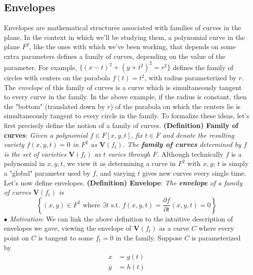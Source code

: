 \documentclass{article}
\begin{document}
\subsection{Envelopes}
Envelopes are mathematical structures associated with families of curves in the plane. In the context in which we'll be studying them, a polynomial curve in the plane $ F^2 $, like the ones with which we've been working, that depends on some extra parameters defines a family of curves, depending on the value of the parameter. For example, $ \{ (x - t)^2 + (y + t^2)^2 = r^2 \} $ defines the family of circles with centers on the parabola $ f(t) = t^2 $, with radius parameterized by $ r $. The \textit{envelope} of this family of curves is a curve which is simultaneously tangent to every curve in the family. In the above example, if the radius is constant, then the "bottom" (translated down by $ r $) of the parabola on which the centers lie is simultaneously tangent to every circle in the family. To formalize these ideas, let's first precisely define the notion of a family of curves.
\newline \newline
\textbf{(Definition) Family of curves}: \textit{Given a polynomial $ f \in F[x, y, t] $, fix $ t \in F $ and denote the resulting variety $f(x, y, t) = 0 $ in $ F^2 $ as $ \mathbf{V}(f_t) $. The \textbf{family of curves} determined by $ f $ is the set of varieties $ \mathbf{V}(f_t) $ as $ t $ varies through $ F $.}
\newline \newline
Although technically $ f $ is a polynomial in $ x, y, t $, we view it as determining a curve in $ F^2 $ with $ x, y $; $ t $ is simply a "global" parameter used by $ f $, and varying $ t $ gives new curves every single time. Let's now define envelopes.
\newline \newline
\textbf{(Definition) Envelope}: \textit{The \textbf{envelope} of a family of curves $ \mathbf{V}(f_t) $ is}
$$ \left \{ (x, y) \in F^2 \text{ where } \exists t \text{ s.t. } f(x, y, t) = \frac{\partial f}{\partial t}(x, y, t) = 0 \right \} $$
\indent $ \bullet $ \textit{Motivation}: We can link the above definition to the intuitive description of envelopes we gave, viewing the envelope of $ \mathbf{V}(f_t) $ as a curve $ C $ where every point on $ C $ is tangent to some $ f_t = 0 $ in the family. Suppose $ C $ is parameterized by
$$ \begin{aligned}
	x &= g(t) \\
	y &= h(t)
\end{aligned} $$
\end{document}
